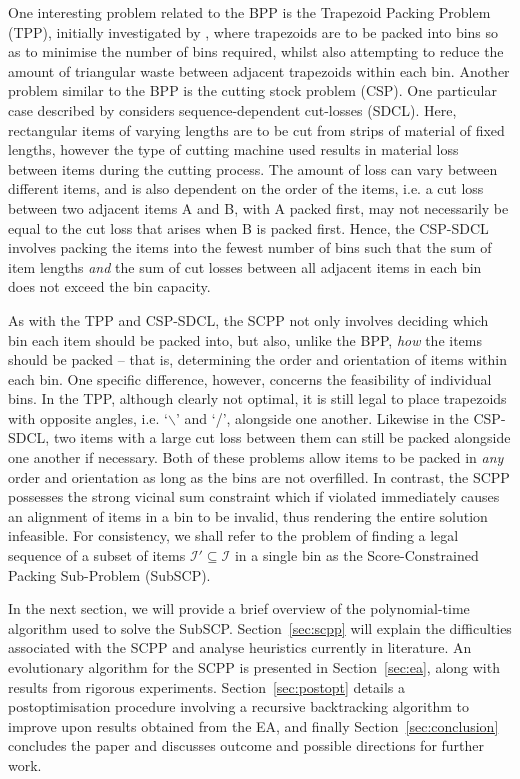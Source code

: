 \documentclass[authoryear]{elsarticle}
\begin{document}
\noindent One interesting problem related to the BPP is the Trapezoid Packing Problem (TPP), initially investigated by \citet{lewis2011}, where trapezoids are to be packed into bins so as to minimise the number of bins required, whilst also attempting to reduce the amount of triangular waste between adjacent trapezoids within each bin. Another problem similar to the BPP is the cutting stock problem (CSP). One particular case described by \citet{garraffa2016} considers sequence-dependent cut-losses (SDCL). Here, rectangular items of varying lengths are to be cut from strips of material of fixed lengths, however the type of cutting machine used results in material loss between items during the cutting process. The amount of loss can vary between different items, and is also dependent on the order of the items, i.e. a cut loss between two adjacent items A and B, with A packed first, may not necessarily be equal to the cut loss that arises when B is packed first. Hence, the CSP-SDCL involves packing the items into the fewest number of bins such that the sum of item lengths \emph{and} the sum of cut losses between all adjacent items in each bin does not exceed the bin capacity.

As with the TPP and CSP-SDCL, the SCPP not only involves deciding which bin each item should be packed into, but also, unlike the BPP, \emph{how} the items should be packed -- that is, determining the order and orientation of items within each bin. One specific difference, however, concerns the feasibility of individual bins. In the TPP, although clearly not optimal, it is still legal to place trapezoids with opposite angles, i.e. `$\backslash$' and `/', alongside one another. Likewise in the CSP-SDCL, two items with a large cut loss between them can still be packed alongside one another if necessary. Both of these problems allow items to be packed in \emph{any} order and orientation as long as the bins are not overfilled. In contrast, the SCPP possesses the strong vicinal sum constraint which if violated immediately causes an alignment of items in a bin to be invalid, thus rendering the entire solution infeasible. For consistency, we shall refer to the problem of finding a legal sequence of a subset of items $\mathcal{I}' \subseteq \mathcal{I}$ in a single bin as the Score-Constrained Packing Sub-Problem (SubSCP).

In the next section, we will provide a brief overview of the polynomial-time algorithm used to solve the SubSCP. Section~\ref{sec:scpp} will explain the difficulties associated with the SCPP and analyse heuristics currently in literature. An evolutionary algorithm for the SCPP is presented in Section~\ref{sec:ea}, along with results from rigorous experiments. Section~\ref{sec:postopt} details a postoptimisation procedure involving a recursive backtracking algorithm to improve upon results obtained from the EA, and finally Section~\ref{sec:conclusion} concludes the paper and discusses outcome and possible directions for further work.
\end{document}

